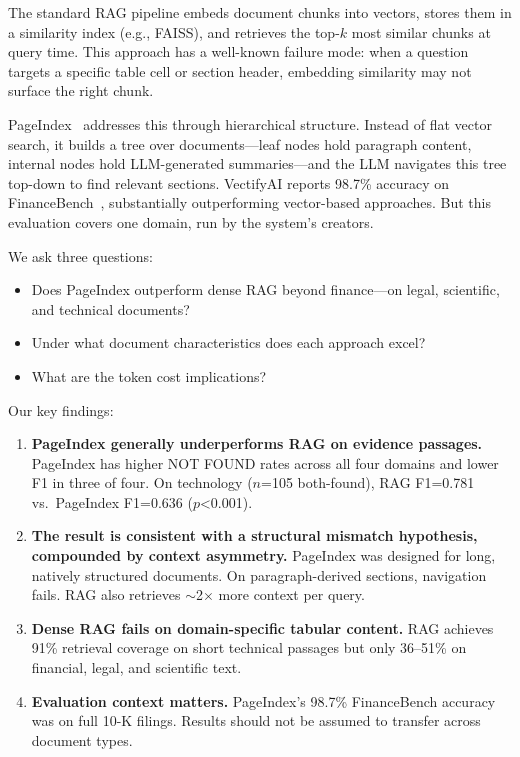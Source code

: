 \documentclass[journal]{IEEEtran}
\begin{document}
The standard RAG pipeline embeds document chunks into vectors, stores them in a similarity index (e.g., FAISS), and retrieves the top-$k$ most similar chunks at query time. This approach has a well-known failure mode: when a question targets a specific table cell or section header, embedding similarity may not surface the right chunk.

PageIndex~\cite{pageindex} addresses this through hierarchical structure. Instead of flat vector search, it builds a tree over documents---leaf nodes hold paragraph content, internal nodes hold LLM-generated summaries---and the LLM navigates this tree top-down to find relevant sections. VectifyAI reports 98.7\% accuracy on FinanceBench~\cite{financebench}, substantially outperforming vector-based approaches. But this evaluation covers one domain, run by the system's creators.

We ask three questions:
\begin{itemize}
\item[\textbf{RQ1.}] Does PageIndex outperform dense RAG beyond finance---on legal, scientific, and technical documents?
\item[\textbf{RQ2.}] Under what document characteristics does each approach excel?
\item[\textbf{RQ3.}] What are the token cost implications?
\end{itemize}

\noindent Our key findings:
\begin{enumerate}
\item \textbf{PageIndex generally underperforms RAG on evidence passages.} PageIndex has higher NOT FOUND rates across all four domains and lower F1 in three of four. On technology ($n$=105 both-found), RAG F1=0.781 vs.\ PageIndex F1=0.636 ($p$<0.001).
\item \textbf{The result is consistent with a structural mismatch hypothesis, compounded by context asymmetry.} PageIndex was designed for long, natively structured documents. On paragraph-derived sections, navigation fails. RAG also retrieves $\sim$2$\times$ more context per query.
\item \textbf{Dense RAG fails on domain-specific tabular content.} RAG achieves 91\% retrieval coverage on short technical passages but only 36--51\% on financial, legal, and scientific text.
\item \textbf{Evaluation context matters.} PageIndex's 98.7\% FinanceBench accuracy was on full 10-K filings. Results should not be assumed to transfer across document types.
\end{enumerate}
\end{document}
